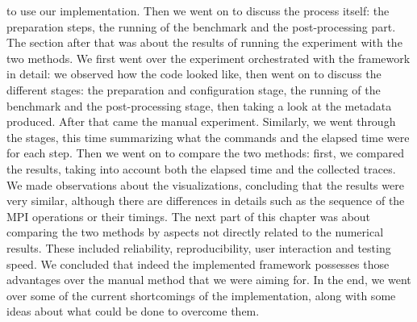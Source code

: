 to use our implementation. Then we went on to discuss the process
itself: the preparation steps, the running of the benchmark and the
post-processing part.\\[0.3cm]
The section after that was about the results of running the
experiment with the two methods. We first went over the experiment
orchestrated with the framework in detail: we observed how the code
looked like, then went on to discuss the different stages: the
preparation and configuration stage, the running of the benchmark and
the post-processing stage, then taking a look at the metadata
produced. After that came the manual experiment. Similarly, we went
through the stages, this time summarizing what the commands and the
elapsed time were for each step. Then we went on to compare the two
methods: first, we compared the results, taking into account both the
elapsed time and the collected traces. We made observations about the
visualizations, concluding that the results were very similar,
although there are differences in details such as the sequence of the
MPI operations or their timings. The next part of this chapter was
about comparing the two methods by aspects not directly related to the
numerical results. These included reliability, reproducibility, user
interaction and testing speed. We concluded that indeed the
implemented framework possesses those advantages over the manual
method that we were aiming for. In the end, we went over some of the
current shortcomings of the implementation, along with some ideas
about what could be done to overcome them.
